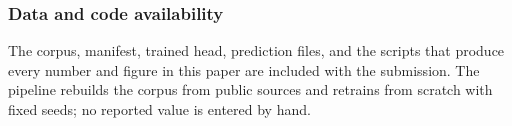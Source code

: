 \documentclass[runningheads]{llncs}
\begin{document}
\subsubsection*{Data and code availability}
The corpus, manifest, trained head, prediction files, and the scripts that produce
every number and figure in this paper are included with the submission. The pipeline
rebuilds the corpus from public sources and retrains from scratch with fixed seeds;
no reported value is entered by hand.



\end{document}
